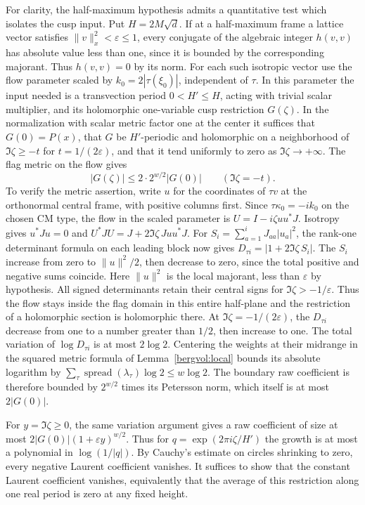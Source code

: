 For clarity, the half-maximum hypothesis admits a quantitative test
which isolates the cusp input. Put \(H=2M\sqrt d\). If at a
half-maximum frame a lattice vector satisfies \(\|v\|_x^2<
\varepsilon\le1\), every conjugate of the algebraic integer
\(h(v,v)\) has absolute value less than one, since it is bounded
by the corresponding majorant. Thus \(h(v,v)=0\) by its norm.
For each such isotropic vector use the flow parameter scaled by
\(k_0=2|\tau(\xi_0)|\), independent of \(\tau\).
In this parameter the input needed is a transvection
period \(0<H'\le H\), acting with trivial scalar multiplier, and its
holomorphic one-variable cusp restriction \(G(\zeta)\). In the
normalization with scalar metric factor one at the center it
suffices that \(G(0)=P(x)\), that \(G\) be \(H'\)-periodic and
holomorphic on a neighborhood of \(\Im\zeta\ge-t\) for
\(t=1/(2\varepsilon)\), and that it tend uniformly to zero as
\(\Im\zeta\to+\infty\). The flag metric on the flow gives
\[
       |G(\zeta)|\le 2\cdot 2^{w/2}|G(0)|
                     \qquad(\Im\zeta=-t).
\]
To verify the metric assertion, write \(u\) for the coordinates of
\(\tau v\) at the orthonormal central frame, with positive columns
first. Since \(\tau\kappa_0=-i k_0\) on the chosen CM type, the
flow in the scaled parameter is \(U=I-i\zeta uu^*J\).
Isotropy gives \(u^*Ju=0\) and
\(U^*JU=J+2\Im\zeta\,Juu^*J\).
For \(S_i=\sum_{a=1}^i J_{aa}|u_a|^2\), the rank-one determinant
formula on each leading block now gives
\(D_{\tau i}=|1+2\Im\zeta\, S_i|\).
The \(S_i\) increase from zero to \(\|u\|^2/2\), then decrease to
zero, since the total positive and negative sums coincide.
Here \(\|u\|^2\) is the local majorant, less than
\(\varepsilon\) by hypothesis. All signed determinants retain their
central signs for \(\Im\zeta>-1/\varepsilon\). Thus the flow stays
inside the flag domain in this entire half-plane and the restriction
of a holomorphic section is holomorphic there.
At \(\Im\zeta=-1/(2\varepsilon)\), the \(D_{\tau i}\) decrease from
one to a number greater than \(1/2\), then increase to one.
The total variation of \(\log D_{\tau i}\) is at most \(2\log2\).
Centering the weights at their midrange in the squared metric formula
of Lemma~\ref{bergvol:local} bounds its absolute logarithm by
\(\sum_\tau\operatorname{spread}(\lambda_\tau)\log2\le w\log2\).
The boundary raw coefficient is therefore bounded by \(2^{w/2}\)
times its Petersson norm, which itself is at most \(2|G(0)|\).

For \(y=\Im\zeta\ge0\), the same variation argument gives a raw
coefficient of size at most \(2|G(0)|(1+\varepsilon y)^{w/2}\).
Thus for \(q=\exp(2\pi i\zeta/H')\) the growth is at most a polynomial
in \(\log(1/|q|)\). By Cauchy's estimate on circles shrinking to
zero, every negative Laurent coefficient vanishes. It suffices to
show that the constant Laurent coefficient vanishes, equivalently
that the average of this restriction along one real period is zero
at any fixed height.

